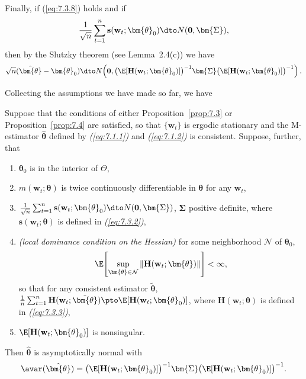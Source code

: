 Finally, if (\ref{eq:7.3.8}) holds and if
\begin{equation}
\label{eq:7.3.9}
\frac{1}{\sqrt{n}} \sum_{t=1}^{n} \mathbf{s}(\mathbf{w}_t; \bm{\theta}_0) \dto N(\mathbf{0}, \bm{\Sigma}),
\end{equation}
then by the Slutzky theorem (see Lemma~2.4(c)) we have
\begin{equation}
\label{eq:7.3.10}
\sqrt{n}(\hat{\bm{\theta}} - \bm{\theta}_0) \dto N\!\left(\mathbf{0}, \bigl(\E[\mathbf{H}(\mathbf{w}_t; \bm{\theta}_0)]\bigr)^{-1} \bm{\Sigma} \bigl(\E[\mathbf{H}(\mathbf{w}_t; \bm{\theta}_0)]\bigr)^{-1}\right).
\end{equation}

Collecting the assumptions we have made so far, we have

\begin{proposition}
\label{prop:7.8}
Suppose that the conditions of either Proposition~\ref{prop:7.3} or Proposition~\ref{prop:7.4} are satisfied, so that $\{\mathbf{w}_t\}$ is ergodic stationary and the M-estimator $\hat{\bm{\theta}}$ defined by \emph{(\ref{eq:7.1.1})} and \emph{(\ref{eq:7.1.2})} is consistent. Suppose, further, that
\begin{enumerate}
\item[(1)] $\bm{\theta}_0$ is in the interior of $\Theta$,
\item[(2)] $m(\mathbf{w}_t; \bm{\theta})$ is twice continuously differentiable in $\bm{\theta}$ for any $\mathbf{w}_t$,
\item[(3)] $\frac{1}{\sqrt{n}} \sum_{t=1}^{n} \mathbf{s}(\mathbf{w}_t; \bm{\theta}_0) \dto N(\mathbf{0}, \bm{\Sigma})$, $\bm{\Sigma}$ positive definite, where $\mathbf{s}(\mathbf{w}_t; \bm{\theta})$ is defined in \emph{(\ref{eq:7.3.2})},
\item[(4)] \emph{(local dominance condition on the Hessian)} \enspace for some neighborhood $\mathcal{N}$ of $\bm{\theta}_0$,
\[
\E\!\left[\sup_{\bm{\theta} \in \mathcal{N}} \| \mathbf{H}(\mathbf{w}_t; \bm{\theta}) \|\right] < \infty,
\]
so that for any consistent estimator $\tilde{\bm{\theta}}$, $\frac{1}{n}\sum_{t=1}^{n}\mathbf{H}(\mathbf{w}_t; \tilde{\bm{\theta}}) \pto \E[\mathbf{H}(\mathbf{w}_t; \bm{\theta}_0)]$, where $\mathbf{H}(\mathbf{w}_t; \bm{\theta})$ is defined in \emph{(\ref{eq:7.3.3})},
\item[(5)] $\E[\mathbf{H}(\mathbf{w}_t; \bm{\theta}_0)]$ is nonsingular.
\end{enumerate}
Then $\hat{\bm{\theta}}$ is asymptotically normal with
\[
\avar(\hat{\bm{\theta}}) = \bigl(\E[\mathbf{H}(\mathbf{w}_t; \bm{\theta}_0)]\bigr)^{-1} \bm{\Sigma} \bigl(\E[\mathbf{H}(\mathbf{w}_t; \bm{\theta}_0)]\bigr)^{-1}.
\]
\end{proposition}

